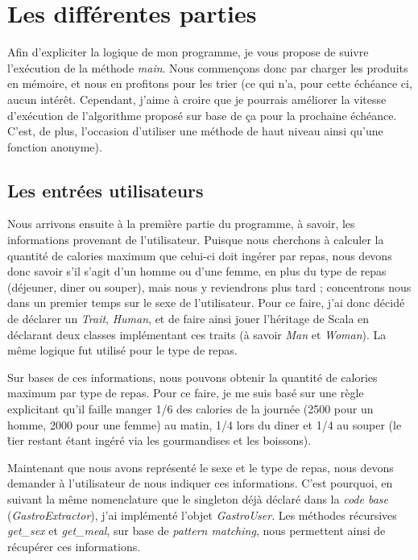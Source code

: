\section{Les différentes parties}
Afin d'expliciter la logique de mon programme, je vous propose de suivre l'exécution de la méthode \textit{main}. 
Nous commençons donc par charger les produits en mémoire, et nous en profitons pour les trier (ce qui n'a, pour cette échéance ci, aucun intérêt. Cependant, j'aime à croire que je pourrais améliorer la vitesse d'exécution de l'algorithme proposé sur base de ça pour la prochaine échéance. C'est, de plus, l'occasion d'utiliser une méthode de haut niveau ainsi qu'une fonction anonyme).

\subsection{Les entrées utilisateurs}
Nous arrivons ensuite à la première partie du programme, à savoir, les informations provenant de l'utilisateur. Puisque nous cherchons à calculer la quantité de calories maximum que celui-ci doit ingérer par repas, nous devons donc savoir s'il s'agit d'un homme ou d'une femme, en plus du type de repas (déjeuner, diner ou souper), mais nous y reviendrons plus tard ; concentrons nous dans un premier temps sur le sexe de l'utilisateur. Pour ce faire, j'ai donc décidé de déclarer un \textit{Trait}, \textit{Human}, et de faire ainsi jouer l'héritage de Scala en déclarant deux classes implémentant ces traits (à savoir \textit{Man} et \textit{Woman}). La même logique fut utilisé pour le type de repas. 

Sur bases de ces informations, nous pouvons obtenir la quantité de calories maximum par type de repas. Pour ce faire, je me suis basé sur une règle explicitant qu'il faille manger 1/6 des calories de la journée (2500 pour un homme, 2000 pour une femme) au matin, 1/4 lors du diner et 1/4 au souper (le \~ tier restant étant ingéré via les gourmandises et les boissons).  

Maintenant que nous avons représenté le sexe et le type de repas, nous devons demander à l'utilisateur de nous indiquer ces informations. C'est pourquoi, en suivant la même nomenclature que le singleton déjà déclaré dans la \textit{code base} (\textit{GastroExtractor}), j'ai implémenté l'objet \textit{GastroUser}. Les méthodes récursives \textit{get\_sex} et \textit{get\_meal}, sur base de \textit{pattern matching}, nous permettent ainsi de récupérer ces informations.
 
